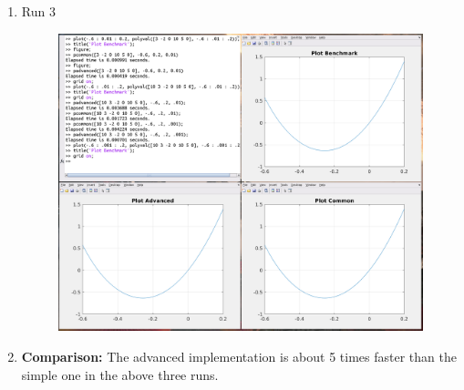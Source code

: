 \documentclass[12pt,a4paper]{article}
\begin{document}
\begin{enumerate}[leftmargin=!,labelindent=5pt]
	\item Run 3
		\begin{figure}[H]
			\centering
			\includegraphics[scale=0.45]{./img/poly_comp_03.png}\label{fig:1}
		\end{figure}

	\item \textbf{Comparison:}
		\newline
		\newline The advanced implementation is about 5 times faster than the simple one
		in the above three runs.
\end{enumerate}

\newpage
\end{document}
